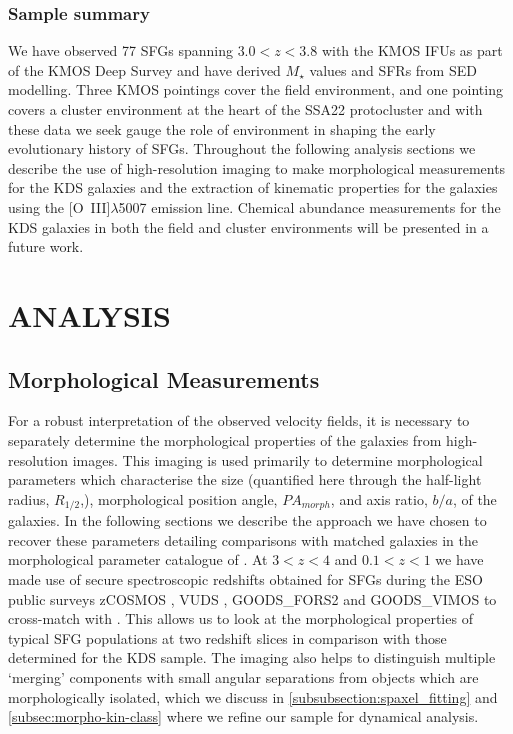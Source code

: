 \documentclass[fleqn,usenatbib]{mn2e}
\begin{document}
\subsubsection{Sample summary}\label{subsubsec:sample_summary}
We have observed 77 SFGs spanning $3.0 < z < 3.8$ with the KMOS IFUs as part of the KMOS Deep Survey and have derived $M_{\star}$ values and SFRs from SED modelling.
Three KMOS pointings cover the field environment, and one pointing covers a cluster environment at the heart of the SSA22 protocluster and with these data we seek gauge the role of environment in shaping the early evolutionary history of SFGs.
Throughout the following analysis sections we describe the use of high-resolution imaging to make morphological measurements for the KDS galaxies and the extraction of kinematic properties for the galaxies using the [O~{\sc III}]$\lambda$5007 emission line.
Chemical abundance measurements for the KDS galaxies in both the field and cluster environments will be presented in a future work.

\section{ANALYSIS}\label{sec:analysis}


\subsection{Morphological Measurements}\label{subsec:morphological_measurements}
For a robust interpretation of the observed velocity fields, it is necessary to separately determine the morphological properties of the galaxies from high-resolution images.
This imaging is used primarily to determine morphological parameters which characterise the size (quantified here through the half-light radius, $R_{1/2}$,), morphological position angle, $PA_{morph}$, and axis ratio, $b/a$, of the galaxies. 
In the following sections we describe the approach we have chosen to recover these parameters detailing comparisons with matched galaxies in the morphological parameter catalogue of \cite{VanderWel2012}.
At $3 < z < 4$ and $0.1 < z < 1$ we have made use of secure spectroscopic redshifts obtained for SFGs during the ESO public surveys zCOSMOS \citep{Lilly2007}, VUDS \citep{Tasca2016}, GOODS\_FORS2 \citep{Vanzella2005,Vanzella2006,Vanzella2008} and GOODS\_VIMOS \citep{Balestra2010} to cross-match with \cite{VanderWel2012}.
This allows us to look at the morphological properties of typical SFG populations at two redshift slices in comparison with those determined for the KDS sample.
The imaging also helps to distinguish multiple `merging' components with small angular separations from objects which are morphologically isolated, which we discuss in \cref{subsubsection:spaxel_fitting} and \cref{subsec:morpho-kin-class} where we refine our sample for dynamical analysis.
\end{document}
